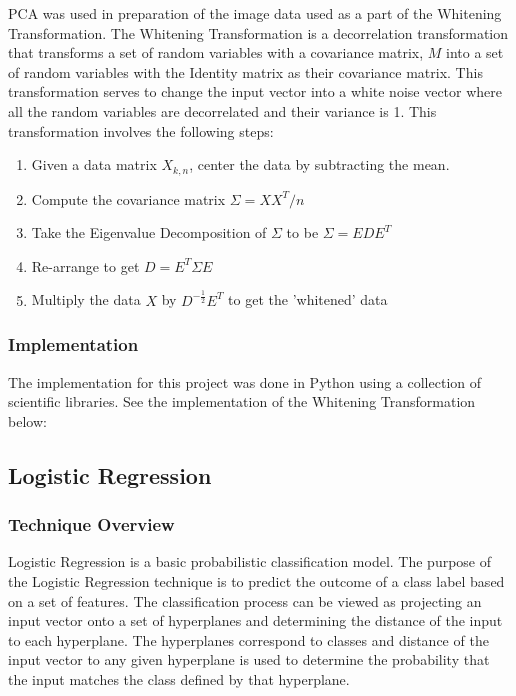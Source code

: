 \documentclass[12pt, titlepage]{article}
\begin{document}
  PCA was used in preparation of the image data used as a part of the Whitening Transformation. The Whitening Transformation is a decorrelation
  transformation that transforms a set of random variables with a covariance matrix, $M$ into a set of random variables with the Identity matrix as
  their covariance matrix. This transformation serves to change the input vector into a white noise vector where all the random variables are decorrelated
  and their variance is 1. This transformation involves the following steps: \\
  \begin{enumerate}
    \item Given a data matrix $X_{k,n}$, center the data by subtracting the mean.
	\item Compute the covariance matrix $\Sigma = X X^{T} / n$
	\item Take the Eigenvalue Decomposition of $\Sigma$ to be $\Sigma = E D E^{T}$
	\item Re-arrange to get $D = E^{T} \Sigma E$
	\item Multiply the data $X$ by $D^{-\frac{1}{2}} E^{T}$ to get the 'whitened' data
  \end{enumerate}

  \subsubsection{Implementation}
  
  The implementation for this project was done in Python using a collection of scientific libraries. See the implementation of the Whitening Transformation below:
  

\subsection{Logistic Regression}
  \subsubsection{Technique Overview}
  
  Logistic Regression is a basic probabilistic classification model. The purpose of the Logistic Regression technique is to predict the outcome of a class label
  based on a set of features. The classification process can be viewed as projecting an input vector onto a set of hyperplanes and determining the distance of the
  input to each hyperplane. The hyperplanes correspond to classes and distance of the input vector to any given hyperplane is used to determine the probability that
  the input matches the class defined by that hyperplane.
\end{document}
